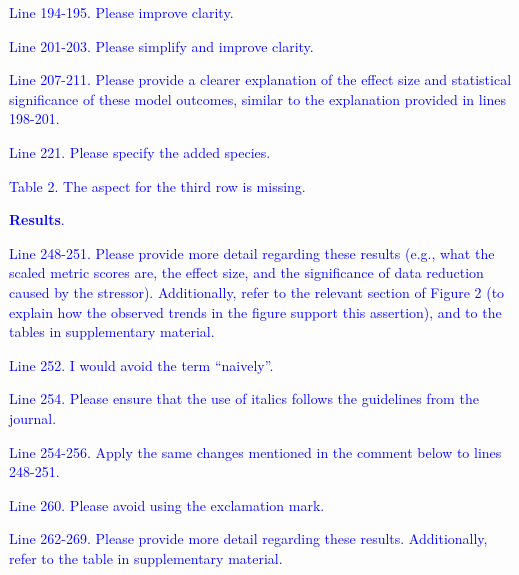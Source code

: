 \documentclass[
]{article}
\begin{document}
\textcolor{blue}{Line 194-195. Please improve clarity.}

\textcolor{blue}{Line 201-203. Please simplify and improve clarity.}

\textcolor{blue}{Line 207-211. Please provide a clearer explanation of the effect size and statistical significance of these model outcomes, similar to the explanation provided in lines 198-201.}

\textcolor{blue}{Line 221. Please specify the added species.}

\textcolor{blue}{Table 2. The aspect for the third row is missing.}

\textcolor{blue}{\textbf{Results}.}

\textcolor{blue}{Line 248-251. Please provide more detail regarding these results (e.g., what the scaled metric scores are, the effect size, and the significance of data reduction caused by the stressor). Additionally, refer to the relevant section of Figure 2 (to explain how the observed trends in the figure support this assertion), and to the tables in supplementary material.}

\textcolor{blue}{Line 252. I would avoid the term ``naively''.}

\textcolor{blue}{Line 254. Please ensure that the use of italics follows the guidelines from the journal.}

\textcolor{blue}{Line 254-256. Apply the same changes mentioned in the comment below to lines 248-251.}

\textcolor{blue}{Line 260. Please avoid using the exclamation mark.}

\textcolor{blue}{Line 262-269. Please provide more detail regarding these results. Additionally, refer to the table in supplementary material.}
\end{document}
